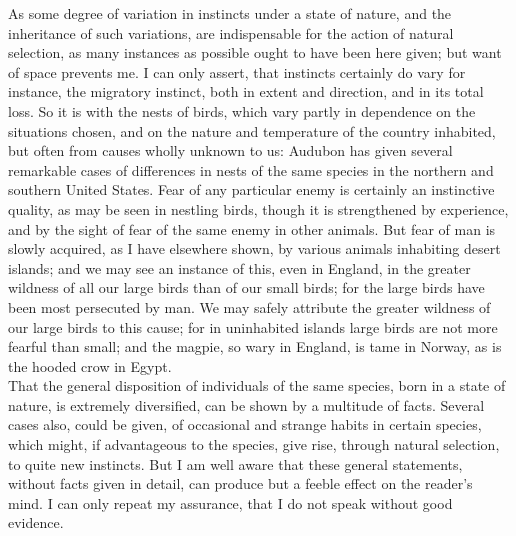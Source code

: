 \indent As some degree of variation in instincts under a state of nature, and the inheritance of such variations, are indispensable for the action of natural selection, as many instances as possible ought to have been here given; but want of space prevents me. I can only assert, that instincts certainly do vary for instance, the migratory instinct, both in extent and direction, and in its total loss. So it is with the nests of birds, which vary partly in dependence on the situations chosen, and on the nature and temperature of the country inhabited, but often from causes wholly unknown to us: Audubon has given several remarkable cases of differences in nests of the same species in the northern and southern United States. Fear of any particular enemy is certainly an instinctive quality, as may be seen in nestling birds, though it is strengthened by experience, and by the sight of fear of the same enemy in other animals. But fear of man is slowly acquired, as I have elsewhere shown, by various animals inhabiting desert islands; and we may see an instance of this, even in England, in the greater wildness of all our large birds than of our small birds; for the large birds have been most persecuted by man. We may safely attribute the greater wildness of our large birds to this cause; for in uninhabited islands large birds are not more fearful than small; and the magpie, so wary in England, is tame in Norway, as is the hooded crow in Egypt.\\
\indent That the general disposition of individuals of the same species, born in a state of nature, is extremely diversified, can be shown by a multitude of facts. Several cases also, could be given, of occasional and strange habits in certain species, which might, if advantageous to the species, give rise, through natural selection, to quite new instincts. But I am well aware that these general statements, without facts given in detail, can produce but a feeble effect on the reader's mind. I can only repeat my assurance, that I do not speak without good evidence.\\
